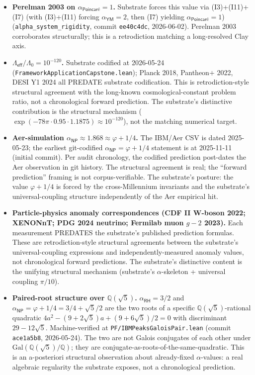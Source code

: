 \documentclass[11pt,a4paper]{amsart}
\theoremstyle{plain}
\theoremstyle{definition}
\begin{document}
\begin{itemize}[itemsep=4pt,leftmargin=2em]
\item \textbf{Perelman 2003 on $\alpha_{\textsf{Poincar\'e}} = 1$.} Substrate forces this value via (I3)+(I11)+(I7) (with (I3)+(I11) forcing $\alpha_{\textsf{YM}}=2$, then (I7) yielding $\alpha_{\textsf{Poincar\'e}}=1$) (\texttt{alpha\_system\_rigidity}, commit \texttt{ee40c4dc}, 2026-06-02). Perelman 2003 corroborates structurally; this is a retrodiction matching a long-resolved Clay axis.
\item \textbf{$\Lambda_{\textsf{eff}}/\Lambda_0 = 10^{-120}$.} Substrate codified at 2026-05-24 (\texttt{FrameworkApplicationCapstone.lean}); Planck 2018, Pantheon$+$ 2022, DESI Y1 2024 all PREDATE substrate codification. This is retrodiction-style structural agreement with the long-known cosmological-constant problem ratio, not a chronological forward prediction. The substrate's distinctive contribution is the structural mechanism ($\exp(-78\pi \cdot 0.95 \cdot 1.1875) \approx 10^{-120}$), not the matching numerical target.
\item \textbf{Aer-simulation $\alpha_{\textsf{NP}} \approx 1.868 \approx \varphi + 1/4$.} The IBM/Aer CSV is dated 2025-05-23; the earliest git-codified \texttt{$\alpha_{\textsf{NP}} = \varphi + 1/4$} statement is at 2025-11-11 (initial commit). Per audit chronology, the codified prediction post-dates the Aer observation in git history. The structural agreement is real; the ``forward prediction'' framing is not corpus-verifiable. The substrate's posture: the value $\varphi + 1/4$ is forced by the cross-Millennium invariants and the substrate's universal-coupling structure independently of the Aer empirical hit.
\item \textbf{Particle-physics anomaly correspondences (CDF II W-boson 2022; XENONnT; PDG 2024 neutrino; Fermilab muon $g-2$ 2023).} Each measurement PREDATES the substrate's published prediction formulas. These are retrodiction-style structural agreements between the substrate's universal-coupling expressions and independently-measured anomaly values, not chronological forward predictions. The substrate's distinctive content is the unifying structural mechanism (substrate's $\alpha$-skeleton + universal coupling $\pi/10$).
\item \textbf{Paired-root structure over $\mathbb{Q}(\sqrt{5})$.} $\alpha_{\textsf{RH}} = 3/2$ and $\alpha_{\textsf{NP}} = \varphi + 1/4 = 3/4 + \sqrt{5}/2$ are the two roots of a specific $\mathbb{Q}(\sqrt{5})$-rational quadratic $4a^2 - (9+2\sqrt{5})a + (9+6\sqrt{5})/2 = 0$ with discriminant $29 - 12\sqrt{5}$. Machine-verified at \texttt{PF/IBMPeaksGaloisPair.lean} (commit \texttt{ace1a5b8}, 2026-05-24). The two are not Galois conjugates of each other under $\mathrm{Gal}(\mathbb{Q}(\sqrt{5})/\mathbb{Q})$; they are conjugate-as-roots-of-the-same-quadratic. This is an a-posteriori structural observation about already-fixed $\alpha$-values: a real algebraic regularity the substrate exposes, not a chronological prediction.
\end{itemize}
\end{document}
